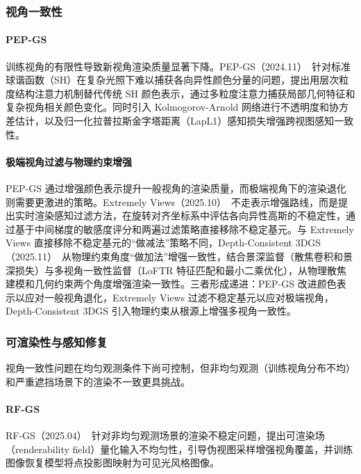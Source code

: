 \subsubsection{视角一致性}

\paragraph{PEP-GS}
训练视角的有限性导致新视角渲染质量显著下降。PEP-GS（2024.11）~\cite{2411_05731}针对标准球谐函数（SH）在复杂光照下难以捕获各向异性颜色分量的问题，提出用层次粒度结构注意力机制替代传统 SH 颜色表示，通过多粒度注意力捕获局部几何特征和复杂视角相关颜色变化。同时引入 Kolmogorov-Arnold 网络进行不透明度和协方差估计，以及归一化拉普拉斯金字塔距离（LapL1）感知损失增强跨视图感知一致性。

\paragraph{极端视角过滤与物理约束增强}
PEP-GS 通过增强颜色表示提升一般视角的渲染质量，而极端视角下的渲染退化则需要更激进的策略。Extremely Views（2025.10）~\cite{2510_20027}不走表示增强路线，而是提出实时渲染感知过滤方法，在旋转对齐坐标系中评估各向异性高斯的不稳定性，通过基于中间梯度的敏感度评分和两遍过滤策略直接移除不稳定基元。与 Extremely Views 直接移除不稳定基元的``做减法''策略不同，Depth-Consistent 3DGS（2025.11）~\cite{2511_10316}从物理约束角度``做加法''增强一致性，结合景深监督（散焦卷积和景深损失）与多视角一致性监督（LoFTR 特征匹配和最小二乘优化），从物理散焦建模和几何约束两个角度增强渲染一致性。三者形成递进：PEP-GS 改进颜色表示以应对一般视角退化，Extremely Views 过滤不稳定基元以应对极端视角，Depth-Consistent 3DGS 引入物理约束从根源上增强多视角一致性。

\subsubsection{可渲染性与感知修复}

视角一致性问题在均匀观测条件下尚可控制，但非均匀观测（训练视角分布不均）和严重遮挡场景下的渲染不一致更具挑战。

\paragraph{RF-GS}
RF-GS（2025.04）~\cite{2504_19261}针对非均匀观测场景的渲染不稳定问题，提出可渲染场（renderability field）量化输入不均匀性，引导伪视图采样增强视角覆盖，并训练图像恢复模型将点投影图映射为可见光风格图像。


